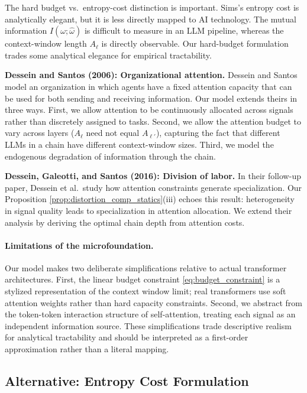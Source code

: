 The hard budget vs.~entropy-cost distinction is important. Sims's entropy cost is analytically elegant, but it is less directly mapped to AI technology. The mutual information $I(\omega; \hat{\omega})$ is difficult to measure in an LLM pipeline, whereas the context-window length $A_\ell$ is directly observable. Our hard-budget formulation trades some analytical elegance for empirical tractability.

\textbf{Dessein and Santos (2006): Organizational attention.} Dessein and Santos model an organization in which agents have a fixed attention capacity that can be used for both sending and receiving information. Our model extends theirs in three ways. First, we allow attention to be continuously allocated across signals rather than discretely assigned to tasks. Second, we allow the attention budget to vary across layers ($A_\ell$ need not equal $A_{\ell'}$), capturing the fact that different LLMs in a chain have different context-window sizes. Third, we model the endogenous degradation of information through the chain.

\textbf{Dessein, Galeotti, and Santos (2016): Division of labor.} In their follow-up paper, Dessein et al.~study how attention constraints generate specialization. Our Proposition \ref{prop:distortion_comp_statics}(iii) echoes this result: heterogeneity in signal quality leads to specialization in attention allocation. We extend their analysis by deriving the optimal chain depth from attention costs.

\paragraph{Limitations of the microfoundation.}
Our model makes two deliberate simplifications relative to actual transformer architectures. First, the linear budget constraint \eqref{eq:budget_constraint} is a stylized representation of the context window limit; real transformers use soft attention weights rather than hard capacity constraints. Second, we abstract from the token-token interaction structure of self-attention, treating each signal as an independent information source. These simplifications trade descriptive realism for analytical tractability and should be interpreted as a first-order approximation rather than a literal mapping.

\subsection{Alternative: Entropy Cost Formulation}
\label{sec:entropy_cost}

